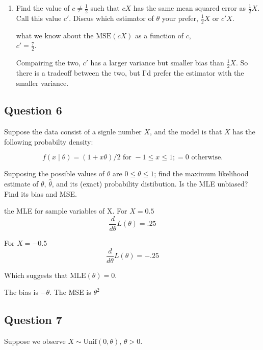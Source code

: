 \documentclass{tufte-book}
\newcommand{\MSE}{\mathrm{MSE}}
\newcommand{\MLE}{\mathrm{MLE}}
\theoremstyle{mytheoremstyle}
\theoremstyle{mylemstyle}
\theoremstyle{mydefstyle}
\begin{document}
\begin{enumerate}
\item Find the value of $c \neq \frac{1}{2}$ such that $cX$ has the same mean squared error as $\frac{1}{2}X$.  Call this value $c'$.  Discus which estimator of $\theta$ your prefer, $\frac{1}{2}X$ or $c'X$.

 what we know about the $\MSE(cX)$ as a function of $c$,\\
 $c'=\frac{7}{2}$.

Compairing the two, $c'$ has a larger variance but smaller bias than $\frac{1}{2}X$.  So there is a tradeoff between the two, but I'd prefer the estimator with the smaller variance.

\end{enumerate}


\subsection{Question 6}
Suppose the data consist of a signle number $X$, and the model is that $X$ has the following probabilty density:

\[ f(x \mid \theta) = (1+x\theta)/2 \text{ for } -1 \leq x \leq 1;=0 \text{ otherwise.} \]

Supposing the possible values of $\theta$ are $0 \leq \theta \leq 1$; find the maximum likelihood estimate of $\theta$, $\hat{\theta}$, and its (exact) probability distibution.  Is the MLE unbiased?  Find its bias and MSE.

 the MLE for sample variables of X.
For $X=0.5$
\[ \frac{d}{d\theta}L(\theta) = .25 \]

For $X=-0.5$
\[ \frac{d}{d\theta}L(\theta) = -.25 \]

Which suggests that $\MLE(\theta) = 0$.

The bias is $-\theta$.  The MSE is $\theta^2$


\subsection{Question 7}
Suppose we observe $X \sim \text{Unif}(0,\theta)$, $\theta > 0$.
\end{document}
